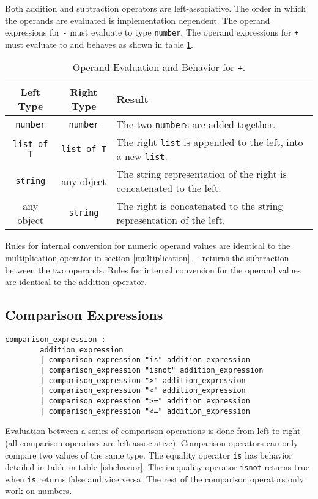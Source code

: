 Both addition and subtraction operators are left-associative. The order in which the operands are evaluated is implementation dependent. The operand expressions for \texttt{-} must evaluate to type \texttt{number}. The operand expressions for \texttt{+} must evaluate to and behaves as shown in table \ref{plusstuff}.
\begin{table}[htdp]
\begin{center}
\begin{tabular}{|c|c|p{7cm}|}
\hline
Left Type & Right Type & Result\\
\hline
\texttt{number} & \texttt{number} & The two \texttt{number}s are added together.\\
\texttt{list of T} & \texttt{list of T} & The right \texttt{list} is appended to the left, into a new \texttt{list}.\\
\texttt{string} & any object & The string representation of the right is concatenated to the left.\\
any object & \texttt{string} & The right is concatenated to the string representation of the left.\\
\hline
\end{tabular}
\end{center}
\caption{Operand Evaluation and Behavior for \texttt{+}.}\label{plusstuff}
\end{table}%



Rules for internal conversion for numeric operand values are identical to the multiplication operator in section \ref{multiplication}. 
\texttt{-} returns the subtraction between the two operands. Rules for internal conversion for the operand values are identical to the addition operator.

\subsection{Comparison Expressions}
\begin{verbatim}
comparison_expression : 
        addition_expression
        | comparison_expression "is" addition_expression
        | comparison_expression "isnot" addition_expression
        | comparison_expression ">" addition_expression
        | comparison_expression "<" addition_expression
        | comparison_expression ">=" addition_expression
        | comparison_expression "<=" addition_expression
\end{verbatim}

Evaluation between a series of comparison operations is done from left to right (all comparison operators are left-associative).  Comparison operators can only compare two values of the same type.
The equality operator \texttt{is} has behavior detailed in table in table \ref{isbehavior}. The inequality operator \texttt{isnot} returns true when \texttt{is} returns false and vice versa. The rest of the comparison operators only work on numbers.

